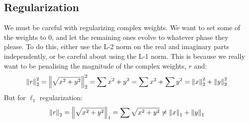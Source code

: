

\subsection{Regularization}
We must be careful with regularizing complex weights. We want to set some
of the weights to 0, and let the remaining ones evolve to whatever phase they
please. To do this, either use the L-2 norm on the real and imaginary parts
independently, or be careful about using the L-1 norm. This is because we
really want to be penalising the magnitude of the complex weights, $r$ and: 
\begin{equation}
  {\left\lVert r \right\rVert}_{2}^2 = {\left\lVert \sqrt{x^2+y^2} \right\rVert}_{2}^2 = \sum x^2 + y^2 = \sum x^2 + \sum y^2 = {\left\lVert x \right\rVert}_{2}^2 + {\left\lVert y \right\rVert}_{2}^2
\end{equation}
But for $\ell_1$ regularization:
\begin{equation}
  {\left\lVert r \right\rVert}_{2} = {\left\lVert \sqrt{x^2+y^2} \right\rVert}_{1} = \sum \sqrt{x^2 + y^2} \neq {\left\lVert x \right\rVert}_{1} + {\left\lVert y \right\rVert}_{1}
\end{equation}


